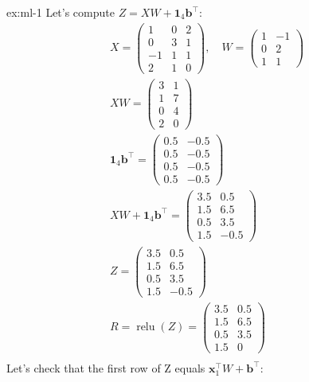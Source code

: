 \begin{solution}{ex:ml-1}
  Let's compute $Z=XW+\mathbf{1}_4 \mathbf{b}^{\!\top}$:
  \[
    \begin{gathered}
      X = \begin{pmatrix}1&0&2\\0&3&1\\-1&1&1\\2&1&0\end{pmatrix},\quad
      W = \begin{pmatrix}1&-1\\0&2\\1&1\end{pmatrix}\\
      XW = \begin{pmatrix}3&1\\1&7\\0&4\\2&0\end{pmatrix}\\
      \mathbf{1}_4 \mathbf{b}^{\!\top} = \begin{pmatrix}0.5&-0.5\\0.5&-0.5\\0.5&-0.5\\0.5&-0.5\end{pmatrix}\\
      XW + \mathbf{1}_4 \mathbf{b}^{\!\top} = \begin{pmatrix}3.5&0.5\\1.5&6.5\\0.5&3.5\\1.5&-0.5\end{pmatrix}\\
      Z = \begin{pmatrix}3.5&0.5\\1.5&6.5\\0.5&3.5\\1.5&-0.5\end{pmatrix}\\
      R=\operatorname{relu}(Z)=\begin{pmatrix}3.5&0.5\\1.5&6.5\\0.5&3.5\\1.5&0\end{pmatrix}\\
    \end{gathered}
  \]
  Let's check that the first row of Z equals $\mathbf{x}^{\!\top}_1W+\mathbf{b}^{\!\top}$:
  \[
    \begin{gathered}

\end{gathered}\]
\end{solution}
